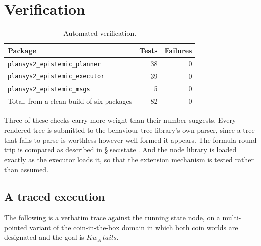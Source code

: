 \documentclass[11pt,a4paper]{article}
\theoremstyle{definition}
\newcommand{\Kw}[1]{\mathit{Kw}_{#1}}
\newcommand{\code}[1]{\texttt{\small #1}}
\begin{document}
\section{Verification}
\label{sec:verif}

\begin{table}[H]
\centering
\small
\begin{tabular}{@{}lrr@{}}
\toprule
\textbf{Package} & \textbf{Tests} & \textbf{Failures} \\
\midrule
\code{plansys2\_epistemic\_planner}  & 38 & 0 \\
\code{plansys2\_epistemic\_executor} & 39 & 0 \\
\code{plansys2\_epistemic\_msgs}     &  5 & 0 \\
\midrule
Total, from a clean build of six packages & 82 & 0 \\
\bottomrule
\end{tabular}
\caption{Automated verification.}
\label{tab:tests}
\end{table}

Three of these checks carry more weight than their number suggests. Every
rendered tree is submitted to the behaviour-tree library's own parser, since a
tree that fails to parse is worthless however well formed it appears. The
formula round trip is compared as described in \S\ref{sec:state}. And the node
library is loaded exactly as the executor loads it, so that the extension
mechanism is tested rather than assumed.

\subsection{A traced execution}

The following is a verbatim trace against the running state node, on a
multi-pointed variant of the coin-in-the-box domain in which both coin worlds are
designated and the goal is $\Kw{A}\,\mathit{tails}$.
\end{document}
